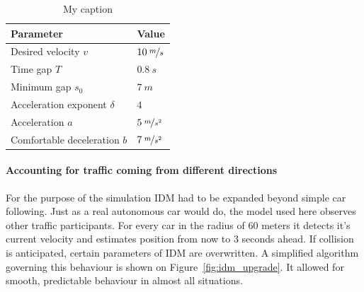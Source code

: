 \documentclass[11pt,english]{article}
\begin{document}
\begin{table}[!]
\centering
\begin{tabular}{|p{7cm}|p{3cm}|}
\hline
\textbf{Parameter}          & \textbf{Value} \\ \hline
Desired velocity $v$          & $10\:\nicefrac{m}{s}$         \\ \hline
Time gap $T$                  & $0.8\:s$          \\ \hline
Minimum gap $s_0$            & $7\:m$            \\ \hline
Acceleration exponent $\delta$ & $4$              \\ \hline
Acceleration $a$              & $5\:\nicefrac{m}{s^2}$         \\ \hline
Comfortable deceleration $b$  & $7\:\nicefrac{m}{s^2}$         \\ \hline
\end{tabular}
\caption{My caption}
\label{table:idm}
\end{table}



\paragraph{Accounting for traffic coming from different directions} For the purpose of the simulation IDM had to be expanded beyond simple car following. Just as a real autonomous car would do, the model used here observes other traffic participants. For every car in the radius of 60 meters it detects it's current velocity and estimates position from now to 3 seconds ahead. 
If collision is anticipated, certain parameters of IDM are overwritten. A simplified algorithm governing this behaviour is shown on Figure~\ref{fig:idm_upgrade}. It allowed for smooth, predictable behaviour in almost all situations. 
\end{document}
